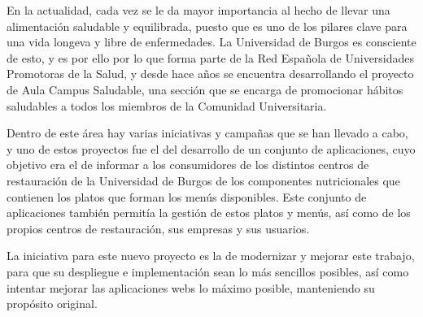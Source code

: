 
En la actualidad, cada vez se le da mayor importancia al hecho de llevar una alimentación saludable y equilibrada, puesto que es uno de los pilares clave para una vida longeva y libre de enfermedades. La Universidad de Burgos es consciente de esto, y es por ello por lo que forma parte de la Red Española de Universidades Promotoras de la Salud, y desde hace años se encuentra desarrollando el proyecto de Aula Campus Saludable, una sección que se encarga de promocionar hábitos saludables a todos los miembros de la Comunidad Universitaria.

Dentro de este área hay varias iniciativas y campañas que se han llevado a cabo, y uno de estos proyectos fue el del desarrollo de un conjunto de aplicaciones, cuyo objetivo era el de informar a los consumidores de los distintos centros de restauración de la Universidad de Burgos de los componentes nutricionales que contienen los platos que forman los menús disponibles. Este conjunto de aplicaciones también permitía la gestión de estos platos y menús, así como de los propios centros de restauración, sus empresas y sus usuarios.

La iniciativa para este nuevo proyecto es la de modernizar y mejorar este trabajo, para que su despliegue e implementación sean lo más sencillos posibles, así como intentar mejorar las aplicaciones webs lo máximo posible, manteniendo su propósito original.
